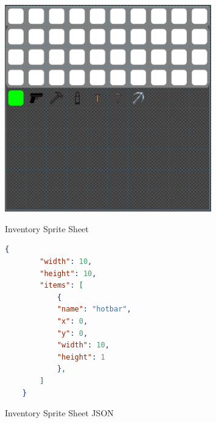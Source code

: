 \begin{figure}[H]
    \centering
    \begin{minipage}{0.45\textwidth}
        \centering
        \includegraphics[width=0.8\textwidth]{chapters/system_architecture/sections/two_dimensional_graphics/resources/SpriteSheet.png}
        \caption{Inventory Sprite Sheet}
        \label{fig:inventory}
    \end{minipage}\hfill
    \begin{minipage}{0.45\textwidth}
    \begin{lstlisting}[language=json,firstline=1]
    {
        "width": 10,
        "height": 10,
        "items": [
            {
            "name": "hotbar",
            "x": 0,
            "y": 0,
            "width": 10,
            "height": 1
            },
        ]
    }
    \end{lstlisting}

    \caption{Inventory Sprite Sheet JSON}
    \label{lst:inventory_sprite_sheet_json}
    \end{minipage}
\end{figure}